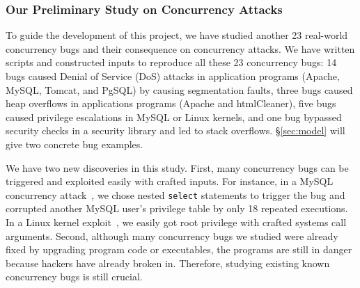 


\vspace{-.15in}\subsubsection{Our Preliminary Study on Concurrency Attacks} 
\label{sec:out-study}\vspace{-.075in}

To guide the development of this \xxx project, we have studied another 23 
real-world concurrency bugs and their consequence on concurrency attacks. We 
have written scripts and constructed inputs to reproduce all these 23 
concurrency bugs: 14 bugs caused Denial of Service (DoS) attacks in application 
programs (Apache, MySQL, Tomcat, and PgSQL) by causing segmentation faults, 
three bugs caused heap overflows in applications programs (Apache and 
htmlCleaner), five bugs caused privilege escalations in MySQL or Linux kernels, 
and one bug bypassed security checks in a security library \libsafe and led to 
stack overflows. \S\ref{sec:model} will give two concrete bug examples.

We have two new discoveries in this study. First, many concurrency bugs can be 
triggered and exploited easily with crafted inputs. For instance, in a MySQL 
concurrency attack~\cite{mysql-bug-14747}, we chose nested 
\texttt{select} statements to trigger the bug and corrupted another 
MySQL user's privilege table by only 18 repeated executions. In a Linux kernel 
exploit~\cite{uselib-bug-12791}, we easily got root privilege with 
crafted systems call arguments. Second, although many concurrency bugs we 
studied were already fixed by upgrading program code or executables, the 
programs are still in danger because hackers have already broken in. Therefore, 
studying existing known concurrency bugs is still crucial.

